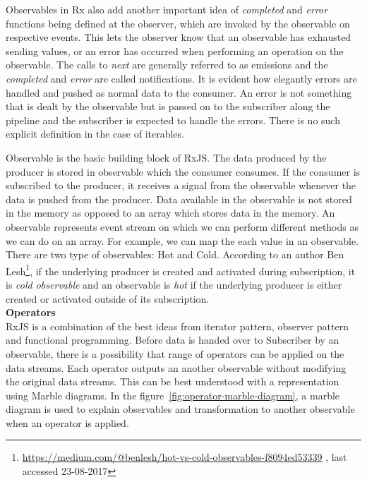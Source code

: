 Observables in Rx also add another important idea of \textit{completed} and \textit{error} functions being defined at the observer, which are invoked by the observable on respective events. This lets the observer know that an observable has exhausted sending values, or an error has occurred when performing an operation on the observable. The calls to \textit{next} are generally referred to as emissions and the \textit{completed} and \textit{error} are called notifications. It is evident how elegantly errors are handled and pushed as normal data to the consumer. An error is not something that is dealt by the observable but is passed on to the subscriber along the pipeline and the subscriber is expected to handle the errors. There is no such explicit definition in the case of iterables.  

Observable is the basic building block of RxJS. The data produced by the producer is stored in observable which the consumer consumes. If the consumer is subscribed to the producer, it receives a signal from the observable whenever the data is pushed from the producer. Data available in the observable is not stored in the memory as opposed to an array which stores data in the memory. An observable represents event stream on which we can perform different methods as we can do on an array. For example, we can map the each value in an observable. There are two type of observables: Hot and Cold. According to an author Ben Lesh\footnote{\url{https://medium.com/@benlesh/hot-vs-cold-observables-f8094ed53339} , last accessed 23-08-2017}, if the underlying producer is created and activated during subscription, it is \textit{cold observable} and an observable is \textit{hot} if the underlying producer is either created or activated outside of its subscription.
\\
\textbf{Operators}
\\
RxJS is a combination of the best ideas from iterator pattern, observer pattern and functional programming\cite{reactiveX}. Before data is handed over to Subscriber by an observable, there is a possibility that range of operators can be applied on the data streams. Each operator outputs an another observable without modifying the original data streams. This can be best understood with a representation using Marble diagrams. In the figure~\ref{fig:operator-marble-diagram},  a marble diagram is used to explain observables and transformation to another observable when an operator is applied. 

